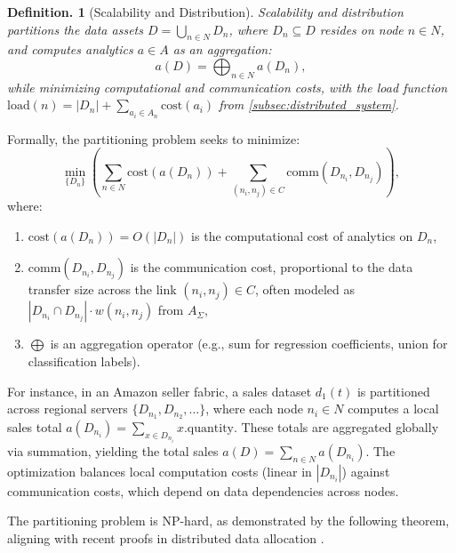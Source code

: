 \documentclass{amsart}
\newtheorem{defn}[thm]{Definition.}
\begin{document}
\begin{defn}[Scalability and Distribution]
\label{scalability_distribution}
\emph{Scalability and distribution} partitions the data assets \( D = \bigcup_{n \in N} D_n \), where \( D_n \subseteq D \) resides on node \( n \in N \), and computes analytics \( a \in A \) as an aggregation:
\[
a(D) = \bigoplus_{n \in N} a(D_n),
\]
while minimizing computational and communication costs, with the load function \( \text{load}(n) = |D_n| + \sum_{a_i \in A_n} \text{cost}(a_i) \) from \cref{subsec:distributed_system}.
\end{defn}

Formally, the partitioning problem seeks to minimize:
\[
\min_{\{D_n\}} \left( \sum_{n \in N} \text{cost}(a(D_n)) + \sum_{(n_i, n_j) \in C} \text{comm}(D_{n_i}, D_{n_j}) \right),
\]
where:
\begin{enumerate}
    \item \( \text{cost}(a(D_n)) = O(|D_n|) \) is the computational cost of analytics on \( D_n \),
    \item \( \text{comm}(D_{n_i}, D_{n_j}) \) is the communication cost, proportional to the data transfer size across the link \( (n_i, n_j) \in C \), often modeled as \( |D_{n_i} \cap D_{n_j}| \cdot w(n_i, n_j) \) from \( A_\Sigma \),
    \item \( \bigoplus \) is an aggregation operator (e.g., sum for regression coefficients, union for classification labels).
\end{enumerate}

For instance, in an Amazon seller fabric, a sales dataset \( d_1(t) \) is partitioned across regional servers \( \{D_{n_1}, D_{n_2}, \dots\} \), where each node \( n_i \in N \) computes a local sales total \( a(D_{n_i}) = \sum_{x \in D_{n_i}} x.\text{quantity} \). These totals are aggregated globally via summation, yielding the total sales \( a(D) = \sum_{n \in N} a(D_{n_i}) \). The optimization balances local computation costs (linear in \( |D_{n_i}| \)) against communication costs, which depend on data dependencies across nodes.

The partitioning problem is NP-hard, as demonstrated by the following theorem, aligning with recent proofs in distributed data allocation \cite{acm2025quantumdata}.
\end{document}
